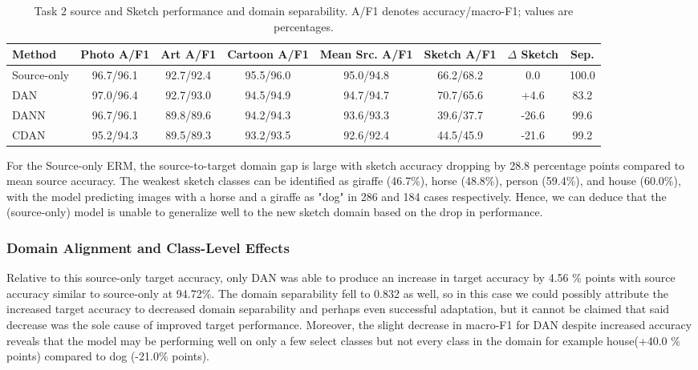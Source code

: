 \documentclass{article}
\begin{document}
\begin{table}[t]
\centering
\caption{Task 2 source and Sketch performance and domain separability. A/F1 denotes accuracy/macro-F1; values are percentages.}
\label{tab:task2_main}
\scriptsize
\setlength{\tabcolsep}{3.2pt}
\begin{tabular}{lccccccc}
\toprule
Method &
Photo A/F1 &
Art A/F1 &
Cartoon A/F1 &
Mean Src. A/F1 &
Sketch A/F1 &
$\Delta$ Sketch &
Sep. \\
\midrule
Source-only &
96.7/96.1 &
92.7/92.4 &
95.5/96.0 &
95.0/94.8 &
66.2/68.2 &
0.0 &
100.0 \\

DAN &
97.0/96.4 &
92.7/93.0 &
94.5/94.9 &
94.7/94.7 &
70.7/65.6 &
+4.6 &
83.2 \\

DANN &
96.7/96.1 &
89.8/89.6 &
94.2/94.3 &
93.6/93.3 &
39.6/37.7 &
-26.6 &
99.6 \\

CDAN &
95.2/94.3 &
89.5/89.3 &
93.2/93.5 &
92.6/92.4 &
44.5/45.9 &
-21.6 &
99.2 \\
\bottomrule
\end{tabular}
\end{table}

For the Source-only ERM, the source-to-target domain gap is large with sketch accuracy dropping by 28.8 percentage points compared to mean source accuracy. The weakest sketch classes can be identified as giraffe (46.7\%), horse (48.8\%), person (59.4\%), and house (60.0\%), with the model predicting images with a horse and a giraffe as "dog" in 286 and 184 cases respectively. Hence, we can deduce that the (source-only) model is unable to generalize well to the new sketch domain based on the drop in performance.


\subsubsection{Domain Alignment and Class-Level Effects}
\label{subsubsec:results-t2-alignment}
Relative to this source-only target accuracy, only DAN was able to produce an increase in target accuracy by 4.56 \% points with source accuracy similar to source-only at 94.72\%. The domain separability fell to 0.832 as well, so in this case we could possibly attribute the increased target accuracy to decreased domain separability and perhaps even successful adaptation, but it cannot be claimed that said decrease was the sole cause of improved target performance. Moreover, the slight decrease in macro-F1 for DAN despite increased accuracy reveals that the model may be performing well on only a few select classes but not every class in the domain for example house(+40.0 \% points) compared to dog (-21.0\% points).
\end{document}
